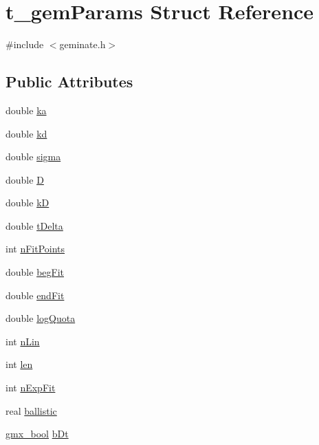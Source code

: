 \hypertarget{structt__gemParams}{\section{t\-\_\-gem\-Params \-Struct \-Reference}
\label{structt__gemParams}
}


{\ttfamily \#include $<$geminate.\-h$>$}

\subsection*{\-Public \-Attributes}
\begin{DoxyCompactItemize}
\item 
double \hyperlink{structt__gemParams_aea7c358f3522a2c4b130e57a9d73a5e4}{ka}
\item 
double \hyperlink{structt__gemParams_a866fe98d681e8d447b783af6ca27917a}{kd}
\item 
double \hyperlink{structt__gemParams_acf2d5c245533627f39ef9717217d0a69}{sigma}
\item 
double \hyperlink{structt__gemParams_a1bc80555383c9b8cfd57159e048068d1}{\-D}
\item 
double \hyperlink{structt__gemParams_acfd18391fb89a7f52aaae811fd9b5865}{k\-D}
\item 
double \hyperlink{structt__gemParams_a21f188d4c27784bbeb085eb211072b3f}{t\-Delta}
\item 
int \hyperlink{structt__gemParams_aa6825e32d3e5a9b72826be9dcb2715b6}{n\-Fit\-Points}
\item 
double \hyperlink{structt__gemParams_a044f189700009bc0341fe51267d8adda}{beg\-Fit}
\item 
double \hyperlink{structt__gemParams_ad10df59463d1747d1d5e1dc69f9bd3b0}{end\-Fit}
\item 
double \hyperlink{structt__gemParams_a71d0e3cdfc198286f1669fbd07d7eed0}{log\-Quota}
\item 
int \hyperlink{structt__gemParams_afd00cbecc1b94eec896fba17d9ab6243}{n\-Lin}
\item 
int \hyperlink{structt__gemParams_a4bf5dc3673b081623bec408cfda26364}{len}
\item 
int \hyperlink{structt__gemParams_a1f1e8f840a4128864d0cfacbefec7834}{n\-Exp\-Fit}
\item 
real \hyperlink{structt__gemParams_a3fb2266216dce29cd60ca3d78be8b269}{ballistic}
\item 
\hyperlink{include_2types_2simple_8h_a8fddad319f226e856400d190198d5151}{gmx\-\_\-bool} \hyperlink{structt__gemParams_a4d26199e583777437f480feb409f0cbd}{b\-Dt}
\end{DoxyCompactItemize}


